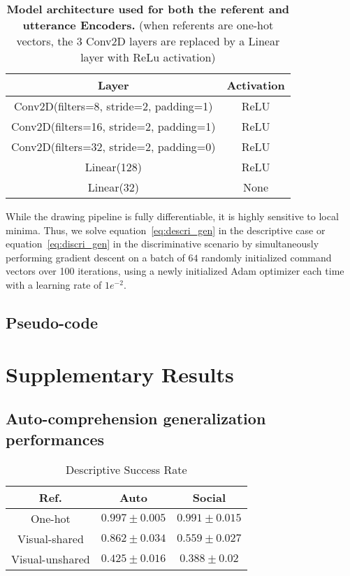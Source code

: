 \begin{table}[h!]
\centering 

\def\arraystretch{1.5}
\begin{tabular}{ |c|c|} 
 \hline
 Layer & Activation\\
 \hline
 Conv2D(filters=8, stride=2, padding=1) & ReLU\\ 
 \hline
 Conv2D(filters=16, stride=2, padding=1) & ReLU\\ 
 \hline
 Conv2D(filters=32, stride=2, padding=0) & ReLU\\ 
 \hline
 Linear(128) & ReLU\\
 \hline
 Linear(32) & None\\
 \hline
\end{tabular}

\caption{\textbf{Model architecture used for both the referent and utterance Encoders.} (when referents are one-hot vectors, the 3 Conv2D layers are replaced by a Linear layer with ReLu activation)}

\label{table:hyperparameters}
\end{table}

While the drawing pipeline is fully differentiable, it is highly sensitive to local minima. Thus, we solve equation~\ref{eq:descri_gen} in the descriptive case or equation~\ref{eq:discri_gen} in the discriminative scenario by simultaneously performing gradient descent on a batch of $64$ randomly initialized command vectors over 100 iterations, using a newly initialized Adam optimizer each time with a learning rate of $1e^{-2}$.

\newpage
\subsection{Pseudo-code}




\newpage
\section{Supplementary Results}

\subsection{Auto-comprehension generalization performances}
\label{sup:auto_social_perf}

\def\arraystretch{1.5}
\begin{table}[!h]
\centering
    \begin{tabular}{|c|c|c|}
     \hline
     \textbf{Ref.} & \textbf{Auto} & \textbf{Social}\\
     \hline
     One-hot & $0.997 \pm 0.005$ & $0.991 \pm 0.015$ \\
     Visual-shared & $0.862 \pm 0.034$ & $0.559 \pm 0.027$  \\
     Visual-unshared & $0.425 \pm 0.016$ & $0.388 \pm 0.02$  \\
     \hline
    \end{tabular}
    \caption{Descriptive Success Rate}
    \label{tab:disc_auto_social}
\end{table}

